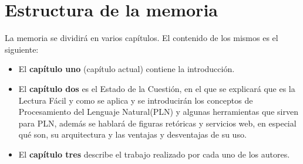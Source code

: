 	
\section{Estructura de la memoria}
\label{cap:sec:estructuramemoria}

La memoria se dividirá en varios capítulos. El contenido de los mismos es el siguiente:
\begin{itemize}
	\item El \textbf{capítulo uno} (capítulo actual) contiene la introducción.
	\item El \textbf{capítulo dos} es el Estado de la Cuestión, en el que se explicará que es la Lectura Fácil y como se aplica y se introducirán los conceptos de Procesamiento del Lenguaje Natural(PLN) y algunas herramientas que sirven para PLN, además se hablará de figuras retóricas y servicios web, en especial qué son, su arquitectura y las ventajas y desventajas de su uso.
	\item El \textbf{capítulo tres} describe el trabajo realizado por cada uno de los autores.
\end{itemize}